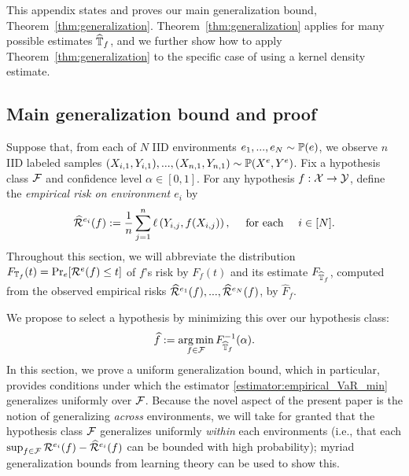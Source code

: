 \documentclass{article}
\begin{document}
%

This appendix states and proves our main generalization bound, Theorem~\ref{thm:generalization}. Theorem~\ref{thm:generalization} applies for many possible estimates $\widehat{\mathbb{T}}_f$, and we further show how to apply Theorem~\ref{thm:generalization} to the specific case of using a kernel density estimate.

%
%
%
%
%
%
%
%

%
%
%
%
%
%
%
%
%
%
%
%
%
%
%

%

\subsection{Main generalization bound and proof}

Suppose that, from each of $N$ IID environments $e_1,...,e_N \sim \mathbb{P}(e)$, we observe $n$ IID labeled samples $(X_{i,1},Y_{i,1}),...,(X_{n,1},Y_{n,1}) \sim \mathbb{P}(X^e, Y^e)$. Fix a hypothesis class $\mathcal{F}$ and confidence level $\alpha \in [0, 1]$. For any hypothesis $f : \mathcal{X} \to \mathcal{Y}$, define the
\emph{empirical risk on environment $e_i$} by
\[\widehat {\mathcal{R}}^{e_i}(f)
  := \frac{1}{n} \sum_{j = 1}^n \ell \left( Y_{i,j}, f(X_{i,j}) \right),
  \quad \text{ for each } \quad
  i \in [N].\]
%
%
Throughout this section, we will abbreviate the distribution $F_{\mathbb{T}_f}(t) = \Pr_e[\mathcal{R}^e(f) \leq t]$ of $f$'s risk by $F_f(t)$ and its estimate
$F_{\widehat{\mathbb{T}}_f}$, computed from the observed empirical risks $\widehat {\mathcal{R}}^{e_1}(f),...,\widehat {\mathcal{R}}^{e_N}(f)$, by $\widehat F_f$.

%
We propose to select a hypothesis by minimizing this over our hypothesis class:
\begin{equation}
    \widehat f := \operatorname*{arg\,min}_{f \in \mathcal{F}} F^{-1}_{\widehat{\mathbb{T}}_f}(\alpha).
    \label{estimator:empirical_VaR_min}
\end{equation}
In this section, we prove a uniform generalization bound, which in particular, provides conditions under which the estimator \eqref{estimator:empirical_VaR_min} generalizes uniformly over $\mathcal{F}$. Because the novel aspect of the present paper is the notion of generalizing \emph{across} environments, we will take for granted that the hypothesis class $\mathcal{F}$ generalizes uniformly \emph{within} each environments (i.e., that each $\sup_{f \in \mathcal{F}} \mathcal{R}^{e_i}(f) - \widehat{\mathcal{R}}^{e_i}(f)$ can be bounded with high probability); myriad generalization bounds from learning theory can be used to show this.
\end{document}
